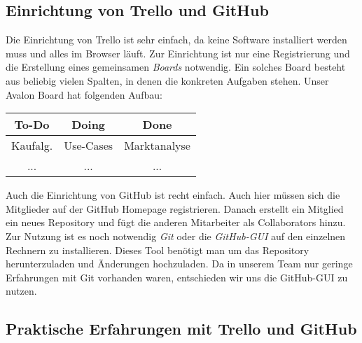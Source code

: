 \subsection{Einrichtung von Trello und GitHub}
 Die Einrichtung von Trello ist sehr einfach, da keine Software installiert werden muss und alles im Browser läuft. Zur Einrichtung ist nur eine Registrierung und die Erstellung eines gemeinsamen \textit{Boards} notwendig. Ein solches Board besteht aus beliebig vielen Spalten, in denen die konkreten Aufgaben stehen. Unser Avalon Board hat folgenden Aufbau:\\
\begin{center}
\begin{tabular}{|c|c|c|}\hline
  \textbf{ To-Do} & \textbf{Doing} & \textbf{Done} \\ \hline
   Kaufalg. & Use-Cases & Marktanalyse \\ \hline
   ... & ... & ... \\ \hline
 \end{tabular}
\end{center}
Auch die Einrichtung von GitHub ist recht einfach. Auch hier müssen sich die Mitglieder auf der GitHub Homepage registrieren. Danach erstellt ein Mitglied ein neues Repository und fügt die anderen Mitarbeiter als Collaborators hinzu. Zur Nutzung ist es noch notwendig \textit{Git} oder die \textit{GitHub-GUI} auf den einzelnen Rechnern zu installieren. Dieses Tool benötigt man um das Repository herunterzuladen und Änderungen hochzuladen. Da in unserem Team nur geringe Erfahrungen mit Git vorhanden waren, entschieden wir uns die GitHub-GUI zu nutzen.
\subsection{Praktische Erfahrungen mit Trello und GitHub}

